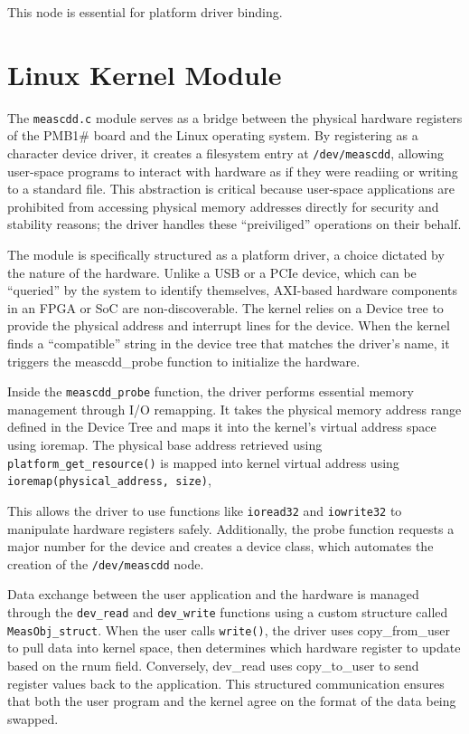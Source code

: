This node is essential for platform driver binding.


\section{Linux Kernel Module}
The \texttt{meascdd.c} module serves as a bridge between the physical hardware registers of the PMB1\# board and the Linux operating system. By registering as a character device driver, it creates a filesystem entry at \texttt{/dev/meascdd}, allowing user-space programs to interact with hardware as if they were readiing or writing to a standard file. This abstraction is critical because user-space applications are prohibited from accessing physical memory addresses directly for security and stability reasons; the driver handles these “preiviliged” operations on their behalf.

The module is specifically structured as a platform driver, a choice dictated by the nature of the hardware. Unlike a USB or a PCIe device, which can be “queried” by the system to identify themselves, AXI-based hardware components in an FPGA or SoC are non-discoverable. The kernel relies on a Device tree to provide the physical address and interrupt lines for the device. When the kernel finds a “compatible” string in the device tree that matches the driver’s name, it triggers the meascdd\_probe function to initialize the hardware.

Inside the \texttt{meascdd\_probe} function, the driver performs essential memory management through I/O remapping. It takes the physical memory address range defined in the Device Tree and maps it into the kernel's virtual address space using ioremap. 
The physical base address retrieved using \texttt{platform\_get\_resource()} is mapped into kernel virtual address using \texttt{ioremap(physical\_address, size)}, 

This allows the driver to use functions like \texttt{ioread32} and \texttt{iowrite32} to manipulate hardware registers safely. Additionally, the probe function requests a major number for the device and creates a device class, which automates the creation of the \texttt{/dev/meascdd} node.

Data exchange between the user application and the hardware is managed through the \texttt{dev\_read} and \texttt{dev\_write} functions using a custom structure called \texttt{MeasObj\_struct}. When the user calls \texttt{write()}, the driver uses copy\_from\_user to pull data into kernel space, then determines which hardware register to update based on the rnum field. Conversely, dev\_read uses copy\_to\_user to send register values back to the application. This structured communication ensures that both the user program and the kernel agree on the format of the data being swapped.

